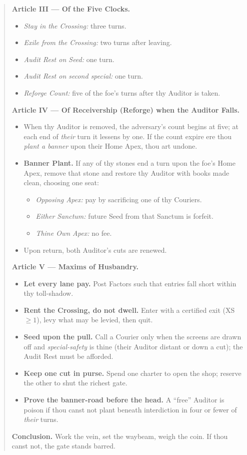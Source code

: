 \documentclass[11pt]{article}
\begin{document}
\begin{quote}
\textbf{Article III — Of the Five Clocks.}
\begin{itemize}\itemsep0.25em
  \item \emph{Stay in the Crossing:} three turns.
  \item \emph{Exile from the Crossing:} two turns after leaving.
  \item \emph{Audit Rest on Seed:} one turn.
  \item \emph{Audit Rest on second special:} one turn.
  \item \emph{Reforge Count:} five of the foe’s turns after thy Auditor is taken.
\end{itemize}

\textbf{Article IV — Of Receivership (Reforge) when the Auditor Falls.}
\begin{itemize}\itemsep0.25em
  \item When thy Auditor is removed, the adversary’s count begins at five; at each end of \emph{their} turn it lessens by one. If the count expire ere thou \emph{plant a banner} upon their Home Apex, thou art undone.
  \item \textbf{Banner Plant.} If any of thy stones end a turn upon the foe’s Home Apex, remove that stone and restore thy Auditor with books made clean, choosing one seat:
    \begin{itemize}\itemsep0.15em
      \item \emph{Opposing Apex:} pay by sacrificing one of thy Couriers.
      \item \emph{Either Sanctum:} future Seed from that Sanctum is forfeit.
      \item \emph{Thine Own Apex:} no fee.
    \end{itemize}
  \item Upon return, both Auditor’s cuts are renewed.
\end{itemize}

\textbf{Article V — Maxims of Husbandry.}
\begin{itemize}\itemsep0.25em
  \item \textbf{Let every lane pay.} Post Factors such that entries fall short within thy toll-shadow.
  \item \textbf{Rent the Crossing, do not dwell.} Enter with a certified exit (XS $\ge 1$), levy what may be levied, then quit.
  \item \textbf{Seed upon the pull.} Call a Courier only when the screens are drawn off and \emph{special-safety} is thine (their Auditor distant or down a cut); the Audit Rest must be afforded.
  \item \textbf{Keep one cut in purse.} Spend one charter to open the shop; reserve the other to shut the richest gate.
  \item \textbf{Prove the banner-road before the head.} A “free” Auditor is poison if thou canst not plant beneath interdiction in four or fewer of \emph{their} turns.
\end{itemize}

\medskip
\textbf{Conclusion.} Work the vein, set the waybeam, weigh the coin. If thou canst not, the gate stands barred.
\end{quote}
\end{document}
